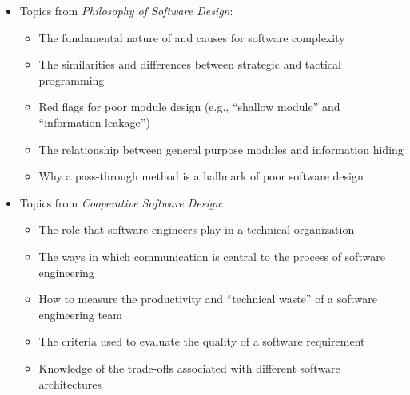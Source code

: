 \documentclass[11pt]{article}
\newcommand{\cooperative}{{\em Cooperative Software Design\/}}
\newcommand{\philosophy}{{\em Philosophy of Software Design\/}}
\begin{document}
\vspace*{-.05in}
\begin{itemize}

  \itemsep 0in
  \itemsep 0.05in

  \item Topics from \philosophy{}:
    \vspace*{-.05in}
    \begin{itemize}

      \itemsep 0.05in

      \item The fundamental nature of and causes for software complexity

      \item The similarities and differences between strategic and tactical
        programming

      \item Red flags for poor module design (e.g., ``shallow module'' and
        ``information leakage'')

      \item The relationship between general purpose modules and information
        hiding

      \item Why a pass-through method is a hallmark of poor software design

    \end{itemize}

  \item Topics from \cooperative{}:
    \vspace*{-.05in}
    \begin{itemize}

      \itemsep 0.05in

      \item The role that software engineers play in a technical organization

      \item The ways in which communication is central to the process of
        software engineering

      \item How to measure the productivity and ``technical waste'' of a
        software engineering team

      \item The criteria used to evaluate the quality of a software requirement

      \item Knowledge of the trade-offs associated with different software
        architectures


\end{itemize}
\end{itemize}
\end{document}
